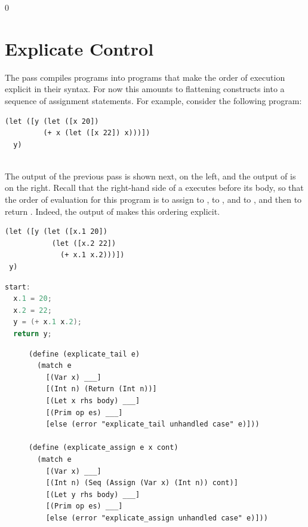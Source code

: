 \documentclass[7x10]{TimesAPriori_MIT}%
\def\racketEd{0}
\def\edition{1}
\numberwithin{theorem}{chapter}
\numberwithin{definition}{chapter}
\numberwithin{equation}{chapter}
\begin{document}
{\if\edition\racketEd  
\section{Explicate Control}
\label{sec:explicate-control-Lvar}

The  pass compiles \LangVarANF{} programs into \LangCVar{}
programs that make the order of execution explicit in their
syntax. For now this amounts to flattening  constructs into a
sequence of assignment statements. For example, consider the following
\LangVar{} program:\\
\begin{minipage}{0.96\textwidth}
\begin{lstlisting}
(let ([y (let ([x 20])
         (+ x (let ([x 22]) x)))])
  y)
\end{lstlisting}
\end{minipage}\\
%
The output of the previous pass is shown next, on the left, and the
output of  is on the right. Recall that the
right-hand side of a  executes before its body, so that the order
of evaluation for this program is to assign  to ,
 to , and  to , and then to
return . Indeed, the output of  makes
this ordering explicit.
\begin{transformation}
\begin{lstlisting}
(let ([y (let ([x.1 20]) 
           (let ([x.2 22])
             (+ x.1 x.2)))])
 y)
\end{lstlisting}
\compilesto
\begin{lstlisting}[language=C]
start:
  x.1 = 20;
  x.2 = 22;
  y = (+ x.1 x.2);
  return y;
\end{lstlisting}
\end{transformation}

\begin{figure}[tbp]
\begin{tcolorbox}[colback=white]
\begin{lstlisting}
(define (explicate_tail e)
  (match e
    [(Var x) ___]
    [(Int n) (Return (Int n))]
    [(Let x rhs body) ___]
    [(Prim op es) ___]
    [else (error "explicate_tail unhandled case" e)]))

(define (explicate_assign e x cont)
  (match e
    [(Var x) ___]
    [(Int n) (Seq (Assign (Var x) (Int n)) cont)]
    [(Let y rhs body) ___]
    [(Prim op es) ___]
    [else (error "explicate_assign unhandled case" e)]))


\end{lstlisting}
\end{tcolorbox}
\end{figure}}
\end{document}
